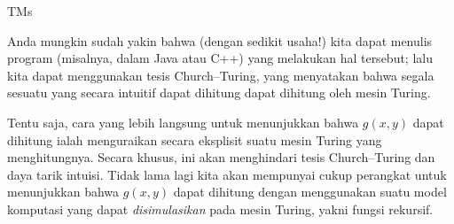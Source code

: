 \documentclass[../../../include/open-logic-section]{subfiles}
\begin{document}
\begin{tagblock}{TMs}
\begin{digress}
Anda mungkin sudah yakin bahwa (dengan sedikit usaha!) kita dapat menulis
program (misalnya, dalam Java atau C++) yang melakukan hal tersebut; lalu kita
dapat menggunakan tesis Church--Turing, yang menyatakan bahwa segala sesuatu
yang secara intuitif dapat dihitung dapat dihitung oleh mesin Turing.

Tentu saja, cara yang lebih langsung untuk menunjukkan bahwa $g(x,y)$ dapat
dihitung ialah menguraikan secara eksplisit suatu mesin Turing yang
menghitungnya. Secara khusus, ini akan menghindari tesis Church--Turing dan
daya tarik intuisi. Tidak lama lagi kita akan mempunyai cukup perangkat untuk
menunjukkan bahwa $g(x,y)$ dapat dihitung dengan menggunakan suatu model
komputasi yang dapat \emph{disimulasikan} pada mesin Turing, yakni fungsi
rekursif.
\end{digress}
\end{tagblock}
\end{document}
